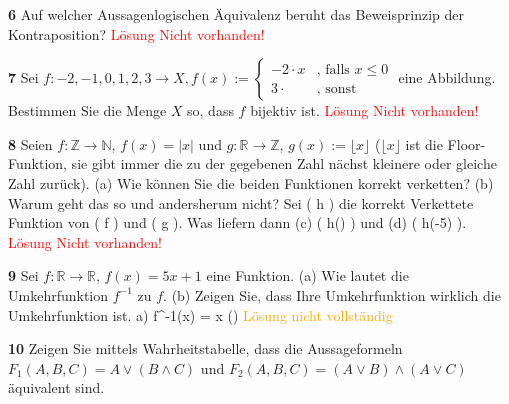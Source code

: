 \documentclass[11pt]{article}
\begin{document}
\textbf{6} Auf welcher Aussagenlogischen Äquivalenz beruht das Beweisprinzip der Kontraposition?\newline
    \textcolor{red}{Lösung Nicht vorhanden!}\newline

    \textbf{7} Sei $f : {-2,-1,0,1,2,3} \rightarrow X, f(x) :=  \begin{cases}
                                                                    -2 \cdot x & \text{, falls $x \leq 0$} \\
                                                                    3 \cdot & \text{, sonst}
    \end{cases}$ eine Abbildung. Bestimmen Sie die Menge $X$ so, dass $f$ bijektiv ist.\newline
    \textcolor{red}{Lösung Nicht vorhanden!}\newline

    \textbf{8} Seien \( f : \mathbb{Z} \rightarrow \mathbb{N} \), \( f(x) = |x| \) und \( g : \mathbb{R} \rightarrow \mathbb{Z} \), \( g(x) := \lfloor x \rfloor \) (\(\lfloor x \rfloor\) ist die Floor-Funktion, sie gibt immer die zu der gegebenen Zahl nächst kleinere oder gleiche Zahl zurück).
    (a) Wie können Sie die beiden Funktionen korrekt verketten? (b) Warum geht das so und andersherum nicht?
    Sei ( h ) die korrekt Verkettete Funktion von ( f ) und ( g ). Was liefern dann (c) ( h(\pi) ) und (d) ( h(-5) ).\newline
    \textcolor{red}{Lösung Nicht vorhanden!}\newline

    \textbf{9} Sei \( f : \mathbb{R} \rightarrow \mathbb{R} \), \( f(x) = 5x + 1 \) eine Funktion. (a) Wie lautet die Umkehrfunktion $f^{-1}$ zu $f$. (b) Zeigen Sie, dass Ihre Umkehrfunktion wirklich die Umkehrfunktion ist.\newline
    a) f^{-1}(x) = x \cdot ()\newline
    \textcolor{orange}{Lösung nicht vollständig}\newline

\textbf{10} Zeigen Sie mittels Wahrheitstabelle, dass die Aussageformeln \(F_1(A,B,C) = A \lor (B \land C)\) und \(F_2(A,B,C) = (A \lor B) \land (A \lor C)\) äquivalent sind.
\end{document}
